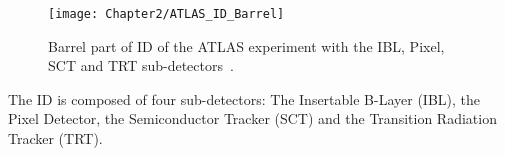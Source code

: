 \begin{figure}
	\centering
 	 \texttt{[image: Chapter2/ATLAS\_ID\_Barrel]}
	 \caption{Barrel part of ID of the ATLAS experiment with the IBL, Pixel, SCT and TRT sub-detectors~\cite{ATL-PHYS-PUB-2018-003, ATLAS:2020ixw}. }
	\label{fig:Chap2:ATLAS:ID_Barel}
\end{figure}

The ID is composed of four sub-detectors: The Insertable B-Layer (IBL), the Pixel Detector, 
the Semiconductor Tracker (SCT) and the Transition Radiation Tracker (TRT). 








